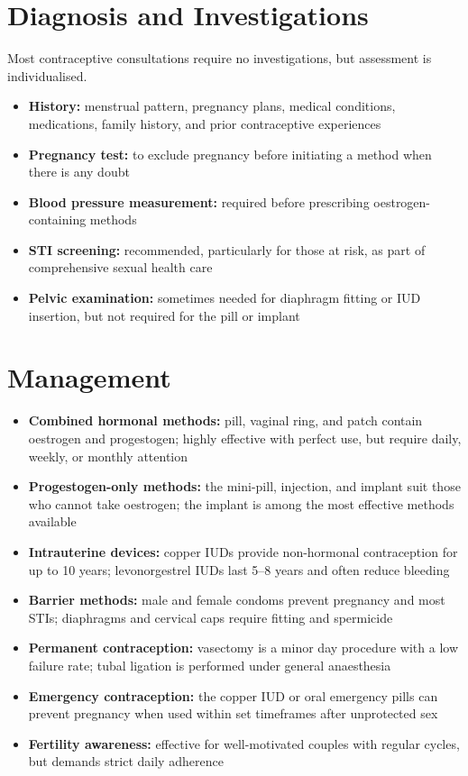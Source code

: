 \section*{Diagnosis and Investigations}
Most contraceptive consultations require no investigations, but assessment is individualised.
\begin{itemize}
    \item \textbf{History:} menstrual pattern, pregnancy plans, medical conditions, medications, family history, and prior contraceptive experiences
    \item \textbf{Pregnancy test:} to exclude pregnancy before initiating a method when there is any doubt
    \item \textbf{Blood pressure measurement:} required before prescribing oestrogen-containing methods
    \item \textbf{STI screening:} recommended, particularly for those at risk, as part of comprehensive sexual health care
    \item \textbf{Pelvic examination:} sometimes needed for diaphragm fitting or IUD insertion, but not required for the pill or implant
\end{itemize}

\section*{Management}
\begin{itemize}
    \item \textbf{Combined hormonal methods:} pill, vaginal ring, and patch contain oestrogen and progestogen; highly effective with perfect use, but require daily, weekly, or monthly attention
    \item \textbf{Progestogen-only methods:} the mini-pill, injection, and implant suit those who cannot take oestrogen; the implant is among the most effective methods available
    \item \textbf{Intrauterine devices:} copper IUDs provide non-hormonal contraception for up to 10 years; levonorgestrel IUDs last 5--8 years and often reduce bleeding
    \item \textbf{Barrier methods:} male and female condoms prevent pregnancy and most STIs; diaphragms and cervical caps require fitting and spermicide
    \item \textbf{Permanent contraception:} vasectomy is a minor day procedure with a low failure rate; tubal ligation is performed under general anaesthesia
    \item \textbf{Emergency contraception:} the copper IUD or oral emergency pills can prevent pregnancy when used within set timeframes after unprotected sex
    \item \textbf{Fertility awareness:} effective for well-motivated couples with regular cycles, but demands strict daily adherence
\end{itemize}

